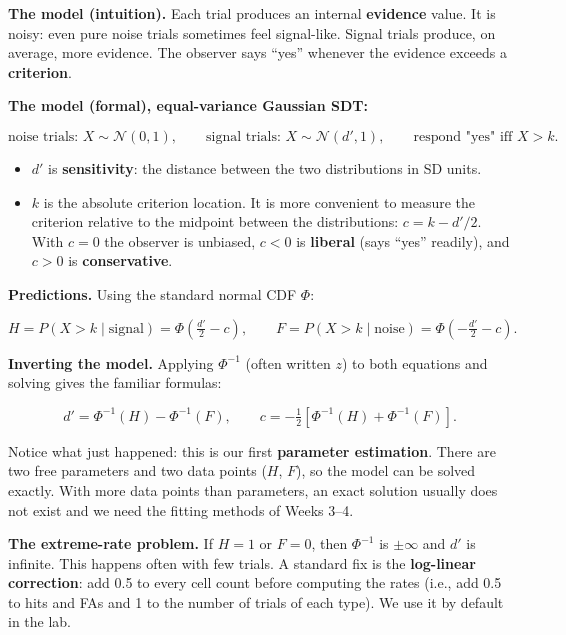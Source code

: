 \textbf{The model (intuition).} Each trial produces an internal
\textbf{evidence} value. It is noisy: even pure noise trials sometimes
feel signal-like. Signal trials produce, on average, more evidence. The
observer says ``yes'' whenever the evidence exceeds a
\textbf{criterion}.

\textbf{The model (formal), equal-variance Gaussian SDT:}

\[
\text{noise trials: } X \sim \mathcal{N}(0, 1), \qquad
\text{signal trials: } X \sim \mathcal{N}(d', 1), \qquad
\text{respond "yes" iff } X > k.
\]

\begin{itemize}
\tightlist
\item
  \(d'\) is \textbf{sensitivity}: the distance between the two
  distributions in SD units.
\item
  \(k\) is the absolute criterion location. It is more convenient to
  measure the criterion relative to the midpoint between the
  distributions: \(c = k - d'/2\). With \(c = 0\) the observer is
  unbiased, \(c < 0\) is \textbf{liberal} (says ``yes'' readily), and
  \(c > 0\) is \textbf{conservative}.
\end{itemize}

\textbf{Predictions.} Using the standard normal CDF \(\Phi\):

\[
H = P(X > k \mid \text{signal}) = \Phi\!\left(\tfrac{d'}{2} - c\right), \qquad
F = P(X > k \mid \text{noise}) = \Phi\!\left(-\tfrac{d'}{2} - c\right).
\]

\textbf{Inverting the model.} Applying \(\Phi^{-1}\) (often written
\(z\)) to both equations and solving gives the familiar formulas:

\[
d' = \Phi^{-1}(H) - \Phi^{-1}(F), \qquad
c = -\tfrac{1}{2}\left[\Phi^{-1}(H) + \Phi^{-1}(F)\right].
\]

Notice what just happened: this is our first \textbf{parameter
estimation}. There are two free parameters and two data points (\(H\),
\(F\)), so the model can be solved exactly. With more data points than
parameters, an exact solution usually does not exist and we need the
fitting methods of Weeks 3--4.

\textbf{The extreme-rate problem.} If \(H = 1\) or \(F = 0\), then
\(\Phi^{-1}\) is \(\pm\infty\) and \(d'\) is infinite. This happens
often with few trials. A standard fix is the \textbf{log-linear
correction}: add 0.5 to every cell count before computing the rates
(i.e., add 0.5 to hits and FAs and 1 to the number of trials of each
type). We use it by default in the lab.

